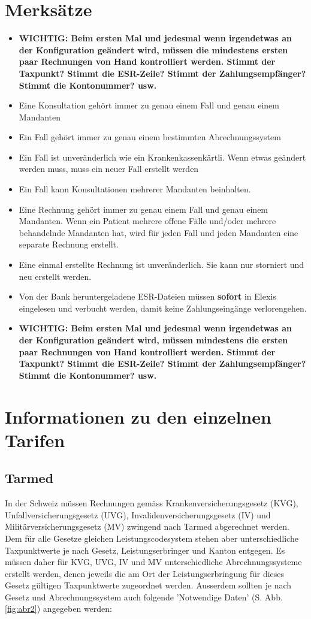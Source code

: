 \documentclass[a4paper]{scrartcl}
\begin{document}
\section{Merksätze}
\begin{itemize}
\item \textbf{WICHTIG: Beim ersten Mal und jedesmal wenn irgendetwas an der Konfiguration geändert wird, müssen die mindestens ersten paar Rechnungen von Hand kontrolliert werden. Stimmt der Taxpunkt? Stimmt die ESR-Zeile? Stimmt der Zahlungsempfänger? Stimmt die Kontonummer? usw.}
\item Eine Konsultation gehört immer zu genau einem Fall und genau einem Mandanten
\item Ein Fall gehört immer zu genau einem bestimmten Abrechnungssystem
\item Ein Fall ist unveränderlich wie ein Krankenkassenkärtli. Wenn etwas geändert werden muss, muss ein neuer Fall erstellt werden
\item Ein Fall kann Konsultationen mehrerer Mandanten beinhalten.
\item Eine Rechnung gehört immer zu genau einem Fall und genau einem Mandanten. Wenn ein Patient mehrere offene Fälle und/oder mehrere behandelnde Mandanten hat, wird für jeden Fall und jeden Mandanten eine separate Rechnung erstellt.
\item Eine einmal erstellte Rechnung ist unveränderlich. Sie kann nur storniert und neu erstellt werden.
\item Von der Bank heruntergeladene ESR-Dateien müssen \textbf{sofort} in Elexis eingelesen und verbucht werden, damit keine Zahlungseingänge verlorengehen.
\item \textbf{WICHTIG: Beim ersten Mal und jedesmal wenn irgendetwas an der Konfiguration geändert wird, müssen mindestens die ersten paar Rechnungen von Hand kontrolliert werden. Stimmt der Taxpunkt? Stimmt die ESR-Zeile? Stimmt der Zahlungsempfänger? Stimmt die Kontonummer? usw.}

\end{itemize}

\section{Informationen zu den einzelnen Tarifen}
\subsection{Tarmed}
In der Schweiz müssen Rechnungen gemäss Krankenversicherungsgesetz (KVG), Unfallversicherungsgesetz (UVG), Invalidenversicherungsgesetz (IV) und Militärversicherungsgesetz (MV) zwingend nach Tarmed abgerechnet werden.  Dem für alle Gesetze gleichen Leistungscodesystem stehen aber unterschiedliche Taxpunktwerte je nach Gesetz, Leistungserbringer und Kanton entgegen. Es müssen daher für KVG, UVG, IV und MV unterschiedliche Abrechnungssysteme erstellt werden, denen jeweils die am Ort der Leistungserbringung für dieses Gesetz gültigen Taxpunktwerte zugeordnet werden.  Ausserdem sollten je nach Gesetz und Abrechnungssystem auch folgende 'Notwendige Daten' (S. Abb. \ref{fig:abr2}) angegeben werden:\\
\end{document}

